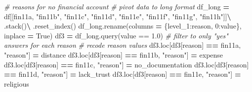 \documentclass[water,article,submit,moreauthors,pdftex]{mdpi}
\newenvironment{Shaded}{\begin{snugshade}}{\end{snugshade}}
\newcommand{\CommentTok}[1]{\textcolor[rgb]{0.56,0.35,0.01}{\textit{#1}}}
\newcommand{\DecValTok}[1]{\textcolor[rgb]{0.00,0.00,0.81}{#1}}
\newcommand{\NormalTok}[1]{#1}
\newcommand{\OperatorTok}[1]{\textcolor[rgb]{0.81,0.36,0.00}{\textbf{#1}}}
\newcommand{\StringTok}[1]{\textcolor[rgb]{0.31,0.60,0.02}{#1}}
\newcommand{\VariableTok}[1]{\textcolor[rgb]{0.00,0.00,0.00}{#1}}
\begin{document}
\begin{Shaded}
\begin{Highlighting}[]
\CommentTok{\# reasons for no financial account}
\CommentTok{\# pivot data to long format}
\NormalTok{df\_long }\OperatorTok{=}\NormalTok{ df[[}\StringTok{\textquotesingle{}fin11a\textquotesingle{}}\NormalTok{, }\StringTok{"fin11b"}\NormalTok{, }\StringTok{"fin11c"}\NormalTok{, }\StringTok{"fin11d"}\NormalTok{, }\StringTok{"fin11e"}\NormalTok{, }\StringTok{"fin11f"}\NormalTok{, }\StringTok{"fin11g"}\NormalTok{, }\StringTok{"fin11h"}\NormalTok{]]}\OperatorTok{\textbackslash{}}
\NormalTok{.stack()}\OperatorTok{\textbackslash{}}
\NormalTok{.reset\_index()}
\NormalTok{df\_long.rename(columns }\OperatorTok{=}\NormalTok{ \{}\StringTok{\textquotesingle{}level\_1\textquotesingle{}}\NormalTok{:}\StringTok{\textquotesingle{}reason\textquotesingle{}}\NormalTok{, }\DecValTok{0}\NormalTok{:}\StringTok{\textquotesingle{}value\textquotesingle{}}\NormalTok{\}, inplace }\OperatorTok{=} \VariableTok{True}\NormalTok{)}
\NormalTok{df3 }\OperatorTok{=}\NormalTok{ df\_long.query(}\StringTok{\textquotesingle{}value == 1.0\textquotesingle{}}\NormalTok{) }\CommentTok{\# filter to only "yes" answers for each reason}
\CommentTok{\# recode reason values}
\NormalTok{df3.loc[df3[}\StringTok{\textquotesingle{}reason\textquotesingle{}}\NormalTok{] }\OperatorTok{==} \StringTok{\textquotesingle{}fin11a\textquotesingle{}}\NormalTok{, }\StringTok{"reason"}\NormalTok{] }\OperatorTok{=} \StringTok{\textquotesingle{}distance\textquotesingle{}}
\NormalTok{df3.loc[df3[}\StringTok{\textquotesingle{}reason\textquotesingle{}}\NormalTok{] }\OperatorTok{==} \StringTok{\textquotesingle{}fin11b\textquotesingle{}}\NormalTok{, }\StringTok{"reason"}\NormalTok{] }\OperatorTok{=} \StringTok{\textquotesingle{}expense\textquotesingle{}}
\NormalTok{df3.loc[df3[}\StringTok{\textquotesingle{}reason\textquotesingle{}}\NormalTok{] }\OperatorTok{==} \StringTok{\textquotesingle{}fin11c\textquotesingle{}}\NormalTok{, }\StringTok{"reason"}\NormalTok{] }\OperatorTok{=} \StringTok{\textquotesingle{}no\_documentation\textquotesingle{}}
\NormalTok{df3.loc[df3[}\StringTok{\textquotesingle{}reason\textquotesingle{}}\NormalTok{] }\OperatorTok{==} \StringTok{\textquotesingle{}fin11d\textquotesingle{}}\NormalTok{, }\StringTok{"reason"}\NormalTok{] }\OperatorTok{=} \StringTok{\textquotesingle{}lack\_trust\textquotesingle{}}
\NormalTok{df3.loc[df3[}\StringTok{\textquotesingle{}reason\textquotesingle{}}\NormalTok{] }\OperatorTok{==} \StringTok{\textquotesingle{}fin11e\textquotesingle{}}\NormalTok{, }\StringTok{"reason"}\NormalTok{] }\OperatorTok{=} \StringTok{\textquotesingle{}religious\textquotesingle{}}

\end{Highlighting}
\end{Shaded}
\end{document}
